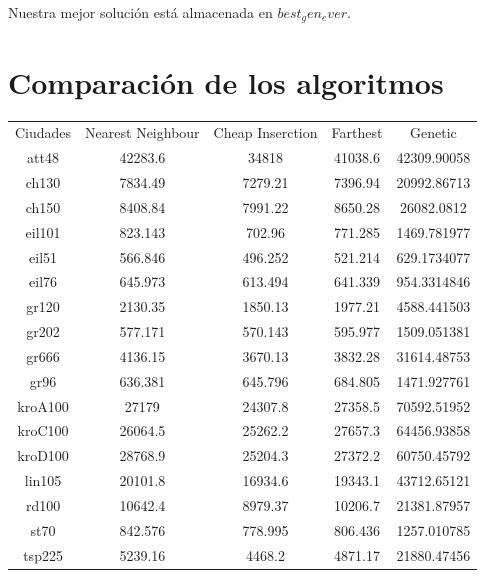 \documentclass{article}
\begin{document}
Nuestra mejor solución está almacenada en $best_gen_ever$.

\section{Comparación de los algoritmos}

\begin{tabular}{ccccc}
Ciudades & Nearest Neighbour & Cheap Inserction & Farthest & Genetic \\
att48 & 42283.6 & 34818 & 41038.6 & 42309.90058 \\
ch130 & 7834.49 & 7279.21 & 7396.94 & 20992.86713 \\
ch150 & 8408.84 & 7991.22 & 8650.28 & 26082.0812 \\
eil101 & 823.143 & 702.96 & 771.285 & 1469.781977 \\
eil51 & 566.846 & 496.252 & 521.214 & 629.1734077 \\
eil76 & 645.973 & 613.494 & 641.339 & 954.3314846 \\
gr120 & 2130.35 & 1850.13 & 1977.21 & 4588.441503 \\
gr202 & 577.171 & 570.143 & 595.977 & 1509.051381 \\
gr666 & 4136.15 & 3670.13 & 3832.28 & 31614.48753 \\
gr96 & 636.381 & 645.796 & 684.805 & 1471.927761 \\
kroA100 & 27179 & 24307.8 & 27358.5 & 70592.51952 \\
kroC100 & 26064.5 & 25262.2 & 27657.3 & 64456.93858 \\
kroD100 & 28768.9 & 25204.3 & 27372.2 & 60750.45792 \\
lin105 & 20101.8 & 16934.6 & 19343.1 & 43712.65121 \\
rd100 & 10642.4 & 8979.37 & 10206.7 & 21381.87957 \\
st70 & 842.576 & 778.995 & 806.436 & 1257.010785 \\
tsp225 & 5239.16 & 4468.2 & 4871.17 & 21880.47456 \\
\end{tabular} 
\end{document}
